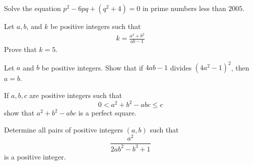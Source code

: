 
\begin{problem}[IZHO 2005] %
	Solve the equation  $ p^2 - 6pq + (q^2 + 4) = 0$ in prime numbers less than $2005$.
\end{problem}

\begin{problem}
	Let $ a,b$, and $k $ be positive integers such that
		\begin{align*}
			k=\frac{a^2+b^2}{ab-1}
		\end{align*}
	Prove that $ k=5 $.
\end{problem}

\begin{problem}[IMO 2007] %
	Let $a$ and $b$ be positive integers. Show that if $4ab - 1$ divides $(4a^{2} - 1)^{2}$, then $a = b$.
\end{problem}

\begin{problem}[PEN] %
	If $a, b, c$ are positive integers such that \[0 < a^{2}+b^{2}-abc \le c\] show that $a^{2}+b^{2}-abc$ is a perfect square.
\end{problem}

\begin{problem} %
	Determine all pairs of positive integers $(a,b)$ such that \[ \dfrac{a^2}{2ab^2-b^3+1} \] is a positive integer.
\end{problem}

